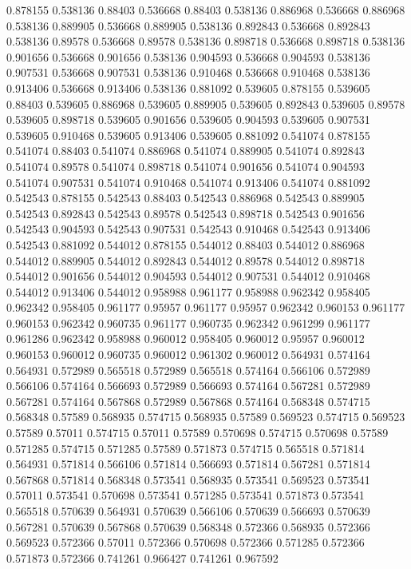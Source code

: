 0.878155 0.538136
0.88403 0.536668
0.88403 0.538136
0.886968 0.536668
0.886968 0.538136
0.889905 0.536668
0.889905 0.538136
0.892843 0.536668
0.892843 0.538136
0.89578 0.536668
0.89578 0.538136
0.898718 0.536668
0.898718 0.538136
0.901656 0.536668
0.901656 0.538136
0.904593 0.536668
0.904593 0.538136
0.907531 0.536668
0.907531 0.538136
0.910468 0.536668
0.910468 0.538136
0.913406 0.536668
0.913406 0.538136
0.881092 0.539605
0.878155 0.539605
0.88403 0.539605
0.886968 0.539605
0.889905 0.539605
0.892843 0.539605
0.89578 0.539605
0.898718 0.539605
0.901656 0.539605
0.904593 0.539605
0.907531 0.539605
0.910468 0.539605
0.913406 0.539605
0.881092 0.541074
0.878155 0.541074
0.88403 0.541074
0.886968 0.541074
0.889905 0.541074
0.892843 0.541074
0.89578 0.541074
0.898718 0.541074
0.901656 0.541074
0.904593 0.541074
0.907531 0.541074
0.910468 0.541074
0.913406 0.541074
0.881092 0.542543
0.878155 0.542543
0.88403 0.542543
0.886968 0.542543
0.889905 0.542543
0.892843 0.542543
0.89578 0.542543
0.898718 0.542543
0.901656 0.542543
0.904593 0.542543
0.907531 0.542543
0.910468 0.542543
0.913406 0.542543
0.881092 0.544012
0.878155 0.544012
0.88403 0.544012
0.886968 0.544012
0.889905 0.544012
0.892843 0.544012
0.89578 0.544012
0.898718 0.544012
0.901656 0.544012
0.904593 0.544012
0.907531 0.544012
0.910468 0.544012
0.913406 0.544012
0.958988 0.961177
0.958988 0.962342
0.958405 0.962342
0.958405 0.961177
0.95957 0.961177
0.95957 0.962342
0.960153 0.961177
0.960153 0.962342
0.960735 0.961177
0.960735 0.962342
0.961299 0.961177
0.961286 0.962342
0.958988 0.960012
0.958405 0.960012
0.95957 0.960012
0.960153 0.960012
0.960735 0.960012
0.961302 0.960012
0.564931 0.574164
0.564931 0.572989
0.565518 0.572989
0.565518 0.574164
0.566106 0.572989
0.566106 0.574164
0.566693 0.572989
0.566693 0.574164
0.567281 0.572989
0.567281 0.574164
0.567868 0.572989
0.567868 0.574164
0.568348 0.574715
0.568348 0.57589
0.568935 0.574715
0.568935 0.57589
0.569523 0.574715
0.569523 0.57589
0.57011 0.574715
0.57011 0.57589
0.570698 0.574715
0.570698 0.57589
0.571285 0.574715
0.571285 0.57589
0.571873 0.574715
0.565518 0.571814
0.564931 0.571814
0.566106 0.571814
0.566693 0.571814
0.567281 0.571814
0.567868 0.571814
0.568348 0.573541
0.568935 0.573541
0.569523 0.573541
0.57011 0.573541
0.570698 0.573541
0.571285 0.573541
0.571873 0.573541
0.565518 0.570639
0.564931 0.570639
0.566106 0.570639
0.566693 0.570639
0.567281 0.570639
0.567868 0.570639
0.568348 0.572366
0.568935 0.572366
0.569523 0.572366
0.57011 0.572366
0.570698 0.572366
0.571285 0.572366
0.571873 0.572366
0.741261 0.966427
0.741261 0.967592
